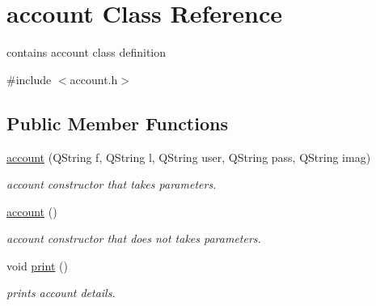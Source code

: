 \hypertarget{classaccount}{}\section{account Class Reference}
\label{classaccount}


contains account class definition  




{\ttfamily \#include $<$account.\+h$>$}

\subsection*{Public Member Functions}
\begin{DoxyCompactItemize}
\item 
\hyperlink{classaccount_a0330688878c8da389718a3b880ad59ac}{account} (Q\+String f, Q\+String l, Q\+String user, Q\+String pass, Q\+String imag)
\begin{DoxyCompactList}\small\item\em account constructor that takes parameters. \end{DoxyCompactList}\item 
\hyperlink{classaccount_a96261021a96c9792b16081e8fcaf23a3}{account} ()
\begin{DoxyCompactList}\small\item\em account constructor that does not takes parameters. \end{DoxyCompactList}\item 
void \hyperlink{classaccount_a94a72bcc59f4875ba0ad26f660150ed1}{print} ()
\begin{DoxyCompactList}\small\item\em prints account details. \end{DoxyCompactList}\end{DoxyCompactItemize}
